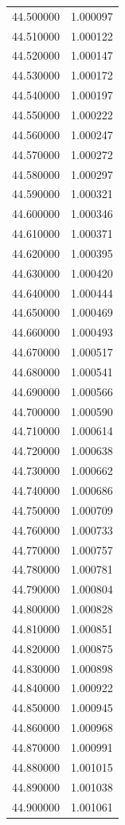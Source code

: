 \begin{tabular}{rr}
44.500000 & 1.000097 \\
44.510000 & 1.000122 \\
44.520000 & 1.000147 \\
44.530000 & 1.000172 \\
44.540000 & 1.000197 \\
44.550000 & 1.000222 \\
44.560000 & 1.000247 \\
44.570000 & 1.000272 \\
44.580000 & 1.000297 \\
44.590000 & 1.000321 \\
44.600000 & 1.000346 \\
44.610000 & 1.000371 \\
44.620000 & 1.000395 \\
44.630000 & 1.000420 \\
44.640000 & 1.000444 \\
44.650000 & 1.000469 \\
44.660000 & 1.000493 \\
44.670000 & 1.000517 \\
44.680000 & 1.000541 \\
44.690000 & 1.000566 \\
44.700000 & 1.000590 \\
44.710000 & 1.000614 \\
44.720000 & 1.000638 \\
44.730000 & 1.000662 \\
44.740000 & 1.000686 \\
44.750000 & 1.000709 \\
44.760000 & 1.000733 \\
44.770000 & 1.000757 \\
44.780000 & 1.000781 \\
44.790000 & 1.000804 \\
44.800000 & 1.000828 \\
44.810000 & 1.000851 \\
44.820000 & 1.000875 \\
44.830000 & 1.000898 \\
44.840000 & 1.000922 \\
44.850000 & 1.000945 \\
44.860000 & 1.000968 \\
44.870000 & 1.000991 \\
44.880000 & 1.001015 \\
44.890000 & 1.001038 \\
44.900000 & 1.001061 \\

\end{tabular}
